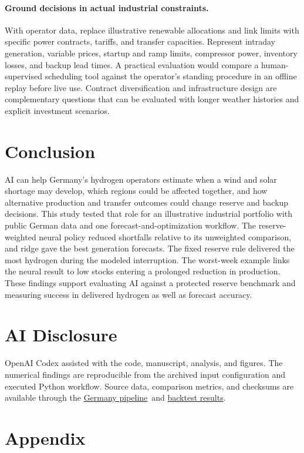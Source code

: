 \documentclass[10pt,a4paper,twocolumn]{article}
\newcommand{\GitHubURL}{https://github.com/parsabe/Beyond-Normal-Weather}
\newcommand{\studyrepo}{\href{\GitHubURL/tree/germany-ai-operations/germany}{Germany pipeline}}
\newcommand{\studydata}{\href{\GitHubURL/tree/germany-ai-operations/germany/report}{backtest results}}
\begin{document}
\paragraph{Ground decisions in actual industrial constraints.}
With operator data, replace illustrative renewable allocations and link limits with specific power contracts, tariffs, and transfer capacities. Represent intraday generation, variable prices, startup and ramp limits, compressor power, inventory losses, and backup lead times. A practical evaluation would compare a human-supervised scheduling tool against the operator's standing procedure in an offline replay before live use. Contract diversification and infrastructure design are complementary questions that can be evaluated with longer weather histories and explicit investment scenarios.

\section{Conclusion}
AI can help Germany's hydrogen operators estimate when a wind and solar shortage may develop, which regions could be affected together, and how alternative production and transfer outcomes could change reserve and backup decisions. This study tested that role for an illustrative industrial portfolio with public German data and one forecast-and-optimization workflow. The reserve-weighted neural policy reduced shortfalls relative to its unweighted comparison, and ridge gave the best generation forecasts. The fixed reserve rule delivered the most hydrogen during the modeled interruption. The worst-week example links the neural result to low stocks entering a prolonged reduction in production. These findings support evaluating AI against a protected reserve benchmark and measuring success in delivered hydrogen as well as forecast accuracy.

\section{AI Disclosure}
OpenAI Codex assisted with the code, manuscript, analysis, and figures. The numerical findings are reproducible from the archived input configuration and executed Python workflow. Source data, comparison metrics, and checksums are available through the \studyrepo\ and \studydata.

\onecolumn

\begingroup
\raggedright

\endgroup
\clearpage
\appendix
{}
\section*{Appendix}

\end{document}
